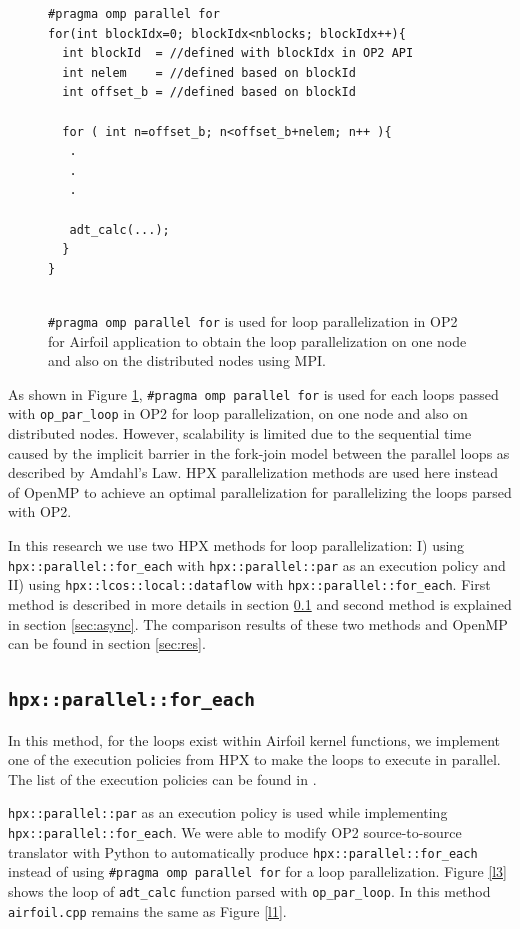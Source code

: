 \documentclass[conference]{IEEEtran}
\begin{document}
\begin{figure} [!h]
    \begin{lstlisting}
#pragma omp parallel for
for(int blockIdx=0; blockIdx<nblocks; blockIdx++){
  int blockId  = //defined with blockIdx in OP2 API
  int nelem    = //defined based on blockId 
  int offset_b = //defined based on blockId
        
  for ( int n=offset_b; n<offset_b+nelem; n++ ){
   .
   .
   .

   adt_calc(...);
  }
}
  
    \end{lstlisting}
    \caption{\small{\texttt{\#pragma omp parallel for} is used for loop parallelization in OP2 for Airfoil application to obtain the loop parallelization on one node and also on the distributed nodes using MPI.}}
    \label{l2}
\end{figure}


As shown in Figure \ref{l2}, \texttt{\#pragma omp parallel for} is used for each loops passed with \texttt{op\_par\_loop} in OP2 for loop parallelization, on one node and also on distributed nodes. However, scalability is limited due to the sequential time  caused by the implicit barrier in the fork-join model \cite{r23} between the parallel loops as described by Amdahl's Law. HPX parallelization methods are used here instead of OpenMP to achieve an optimal parallelization for parallelizing the loops parsed with OP2. 

In this research we use two HPX methods for loop parallelization: I) using \texttt{hpx::parallel::for\_each} with \texttt{hpx::parallel::par} as an execution policy and II) using \texttt{hpx::lcos::local::dataflow} with \texttt{hpx::parallel::for\_each}. First method is described in more details in section \ref{sec:for} and second method is explained in section \ref{sec:async}. The comparison results of these two methods and OpenMP can be found in section \ref{sec:res}.

\subsection{\texttt{hpx::parallel::for\_each} }
\label{sec:for}

In this method, for the loops exist within Airfoil kernel functions, we implement one of the execution policies from HPX to make the loops to execute in parallel. The list of the execution policies can be found in \cite{hpx_v0.9.11}. 

\texttt{hpx::parallel::par} as an execution policy is used while implementing \texttt{hpx::parallel::for\_each}. We were able to modify OP2 source-to-source translator with Python to automatically produce \texttt{hpx::parallel::for\_each} instead of using \texttt{\#pragma omp parallel for} for a loop parallelization. Figure \ref{l3} shows the loop of \texttt{adt\_calc} function parsed with \texttt{op\_par\_loop}. In this method \texttt{airfoil.cpp} remains the same as Figure \ref{l1}.
\end{document}
